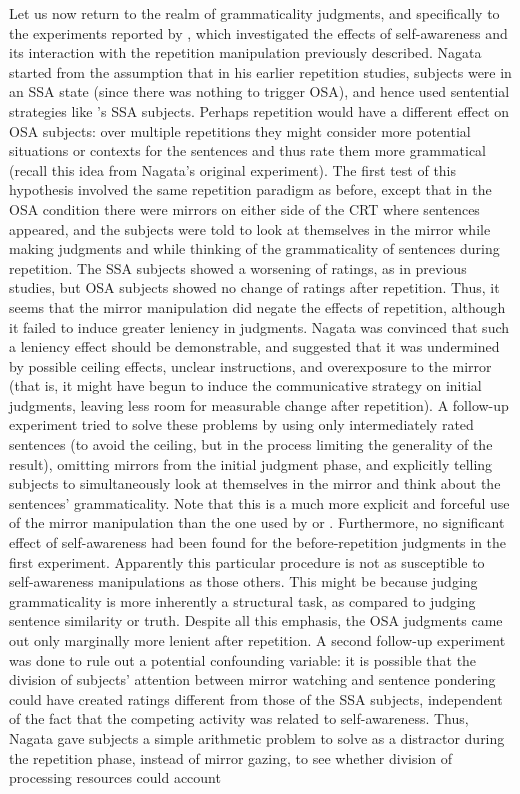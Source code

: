Let us now return to the realm of grammaticality judgments, and specifically to the experiments reported by \citet{Nagata1989a}, which investigated the effects of self-awareness and its interaction with the repetition manipulation previously described. Nagata started from the assumption that in his earlier repetition studies, subjects were in an SSA state (since there was nothing to trigger OSA), and hence used sentential strategies like \citeauthor{CarrollEtAl1981}'s SSA subjects. Perhaps repetition would have a different effect on OSA subjects: over multiple repetitions they might consider more potential situations or contexts for the
sentences  and thus rate them more grammatical  (recall this idea from Nagata's original experiment). The first test of this hypothesis involved the same repetition paradigm as before, except that in the OSA condition there were mirrors on either side of the CRT where sentences appeared, and the subjects were told to look at themselves in the mirror while making judgments  and while thinking of the grammaticality  of sentences during repetition. The SSA subjects showed a worsening of ratings, as in previous studies, but OSA subjects showed no change of ratings after repetition. Thus, it seems that the mirror manipulation  did negate the effects of repetition,  although it failed to induce greater leniency  in judgments.  Nagata was convinced that such a leniency effect should be demonstrable, and suggested that it was undermined by possible ceiling effects, unclear instructions, and overexposure to the mirror (that is, it might have begun to induce the communicative strategy on initial judgments,  leaving less room for measurable change after repetition). A follow-up experiment tried to solve these problems by using only intermediately  rated  sentences  (to avoid the ceiling, but  in the process  limiting the generality of the result), omitting mirrors from the initial judgment phase, and explicitly  telling  subjects to simultaneously  look at themselves  in the mirror and think about the sentences' grammaticality. Note that this is a much more explicit and forceful use of the mirror manipulation than the one used by \citeauthor{DuvalEtAl1972}  or \citeauthor{CarrollEtAl1981}.  Furthermore,  no significant effect of  self-awareness had been found for the before-repetition judgments  in the first experiment. Apparently this particular procedure is not as susceptible to self-awareness manipulations  as those others. This might be because judging  grammaticality  is more inherently  a structural task, as compared to judging  sentence similarity or truth. Despite  all this emphasis,  the OSA judgments  came out only marginally more lenient after repetition. A second follow-up experiment was done to rule out a potential confounding variable: it is possible that the division of subjects' attention between mirror watching and sentence pondering could have created ratings different from those of the SSA subjects, independent of the fact that the competing activity was related  to self-awareness. Thus, Nagata gave subjects a simple arithmetic problem to solve as a distractor during the repetition phase, instead of mirror gazing, to see whether division of processing resources could account 
